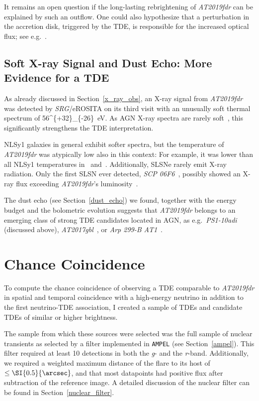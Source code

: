 It remains an open question if the long-lasting rebrightening of \emph{AT2019fdr} can be explained by such an outflow. One could also hypothesize that a perturbation in the accretion disk, triggered by the TDE, is responsible for the increased optical flux; see e.g.~.

\subsection{Soft X-ray Signal and Dust Echo: More Evidence for a TDE}
As already discussed in Section~\ref{x_ray_obs}, an X-ray signal from \textit{AT2019fdr} was detected by \textit{SRG}/eROSITA on its third visit with an unusually soft thermal spectrum of \SI[parse-numbers = false]{56^{+32}_{-26}}{\eV}. As AGN X-ray spectra are rarely soft~, this significantly strengthens the TDE interpretation.

NLSy1 galaxies in general exhibit softer spectra, but the temperature of \emph{AT2019fdr} was atypically low also in this context: For example, it was lower than all NLSy1 temperatures in~ and~. Additionally, SLSNe rarely emit X-ray radiation. Only the first SLSN ever detected, \textit{SCP 06F6}~, possibly showed an X-ray flux exceeding \emph{AT2019fdr}'s luminosity~.

The dust echo (see Section~\ref{dust_echo}) we found, together with the energy budget and the bolometric evolution suggests that \emph{AT2019fdr} belongs to an emerging class of strong TDE candidates located in AGN, as e.g.\ \emph{PS1-10adi} (discussed above), \emph{AT2017gbl}~, or \emph{Arp 299-B AT1}~.

\section{Chance Coincidence}
To compute the chance coincidence of observing a TDE comparable to \emph{AT2019fdr} in spatial and temporal coincidence with a high-energy neutrino in addition to the first neutrino-TDE association, I created a sample of TDEs and candidate TDEs of similar or higher brightness.

The sample from which these sources were selected was the full sample of nuclear transients as selected by a filter implemented in \texttt{AMPEL} (see Section~\ref{ampel}). This filter required at least 10 detections in both the \textit{g}- and the \textit{r}-band. Additionally, we required a weighted maximum distance of the flare to its host of $\leq \SI{0.5}{\arcsec}$, and that most datapoints had positive flux after subtraction of the reference image. A detailed discussion of the nuclear filter can be found in Section~\ref{nuclear_filter}.

